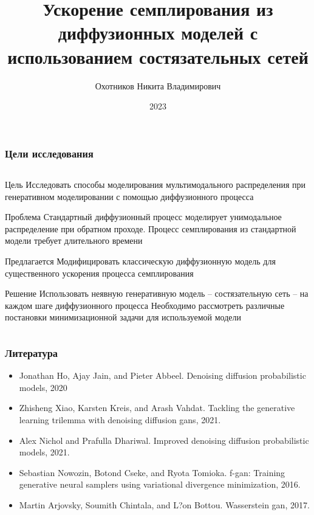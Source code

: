 \documentclass[8pt]{beamer}
\title[]{Ускорение семплирования из диффузионных моделей с использованием состязательных сетей}
\author{Охотников Никита Владимирович}
\institute{МФТИ}
\date{2023}
\newcommand\FontUP{\fontsize{10}{12}\selectfont}
\begin{document}
{
\begin{frame}
  \titlepage
\end{frame}
}

\begin{frame}
	\frametitle{Цели исследования}
	
	\begin{columns}
		\begin{column}{0.9\textwidth}
	
			\begin{block}{Цель}
				\smallskip
			Исследовать способы моделирования мультимодального распределения при генеративном моделировании с помощью диффузионного процесса
			\end{block}	
			\vfill
			\begin{block}{Проблема}
					\smallskip
				Стандартный диффузионный процесс моделирует унимодальное распределение при обратном проходе. Процесс семплирования из стандартной модели требует длительного времени
			\end{block}	
			\vfill
			\begin{block}{Предлагается}
				\smallskip
				Модифицировать классическую диффузионную модель для существенного ускорения процесса семплирования
			\end{block}	
			\vfill
			\begin{block}{Решение}
				\smallskip
				Использовать неявную генеративную модель -- состязательную сеть -- на каждом шаге диффузионного процесса Необходимо
				рассмотреть различные постановки минимизационной задачи для используемой модели
			\end{block}	
	     \end{column}
	\end{columns}


\end{frame}

\begin{frame}
	\frametitle{Литература}
	\FontUP
	\begin{itemize}
		\item Jonathan Ho, Ajay Jain, and Pieter Abbeel. Denoising diffusion probabilistic models, 2020
		\medskip
		\item Zhisheng Xiao, Karsten Kreis, and Arash Vahdat. Tackling the generative learning trilemma with denoising diffusion gans, 2021.
		\medskip
		\item Alex Nichol and Prafulla Dhariwal. Improved denoising diffusion probabilistic models, 2021.
		\medskip
		\item Sebastian Nowozin, Botond Cseke, and Ryota Tomioka. f-gan: Training generative neural samplers using
		variational divergence minimization, 2016.
		\medskip
		\item Martin Arjovsky, Soumith Chintala, and L?on Bottou. Wasserstein gan, 2017.
	\end{itemize}
	
\end{frame}
\end{document}
